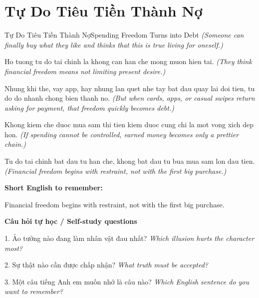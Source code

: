 \section{Tự Do Tiêu Tiền Thành Nợ}
\begin{truyen}{Tự Do Tiêu Tiền Thành Nợ}{Spending Freedom Turns into Debt}
\textit{(Someone can finally buy what they like and thinks that this is true living for oneself.)}

Ho tuong tu do tai chinh la khong can han che mong muon hien tai.
\textit{(They think financial freedom means not limiting present desire.)}

Nhung khi the, vay app, hay nhung lan quet nhe tay bat dau quay lai doi tien, tu do do nhanh chong bien thanh no.
\textit{(But when cards, apps, or casual swipes return asking for payment, that freedom quickly becomes debt.)}

Khong kiem che duoc mua sam thi tien kiem duoc cung chi la mot vong xich dep hon.
\textit{(If spending cannot be controlled, earned money becomes only a prettier chain.)}

\end{truyen}

\begin{baihoc}
Tu do tai chinh bat dau tu han che, khong bat dau tu bua mua sam lon dau tien.
\textit{(Financial freedom begins with restraint, not with the first big purchase.)}
\end{baihoc}

\begin{ghinhoanh}
\textbf{Short English to remember:}

Financial freedom begins with restraint, not with the first big purchase.

\end{ghinhoanh}

\begin{tuhocnhanh}
\textbf{Câu hỏi tự học / Self-study questions}

1. Ảo tưởng nào đang làm nhân vật đau nhất? \textit{Which illusion hurts the character most?}

2. Sự thật nào cần được chấp nhận? \textit{What truth must be accepted?}

3. Một câu tiếng Anh em muốn nhớ là câu nào? \textit{Which English sentence do you want to remember?}
\end{tuhocnhanh}
\ngancach

